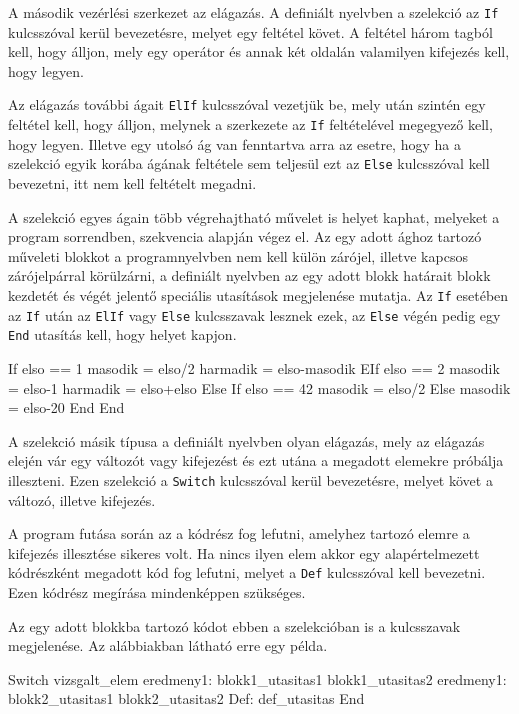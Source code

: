 A második vezérlési szerkezet az elágazás. A definiált nyelvben a szelekció az \texttt{If} kulcsszóval kerül bevezetésre, melyet egy feltétel követ. A feltétel három tagból kell, hogy álljon, mely egy operátor és annak két oldalán valamilyen kifejezés kell, hogy legyen.

Az elágazás további ágait \texttt{ElIf} kulcsszóval vezetjük be, mely után szintén egy feltétel kell, hogy álljon, melynek a szerkezete az \texttt{If} feltételével megegyező kell, hogy legyen. Illetve egy utolsó ág van fenntartva arra az esetre, hogy ha a szelekció egyik korába ágának feltétele sem teljesül ezt az \texttt{Else} kulcsszóval kell bevezetni, itt nem kell feltételt megadni.

A szelekció egyes ágain több végrehajtható művelet is helyet kaphat, melyeket a program sorrendben, szekvencia alapján végez el. Az egy adott ághoz tartozó műveleti blokkot a programnyelvben nem kell külön zárójel, illetve kapcsos zárójelpárral körülzárni, a definiált nyelvben az egy adott blokk határait blokk kezdetét és végét jelentő speciális utasítások megjelenése mutatja. Az \texttt{If} esetében az \texttt{If} után az \texttt{ElIf} vagy \texttt{Else} kulcsszavak lesznek ezek, az \texttt{Else} végén pedig egy \texttt{End} utasítás kell, hogy helyet kapjon.
\begin{cpp}
If elso == 1
	masodik = elso/2
	harmadik = elso-masodik
EIf elso == 2
	masodik = elso-1
	harmadik =  elso+elso
Else
	If elso == 42
		masodik = elso/2
	Else
		masodik = elso-20
	End
End
\end{cpp}

A szelekció másik típusa a definiált nyelvben olyan elágazás, mely az elágazás elején vár egy változót vagy kifejezést és ezt utána a megadott elemekre próbálja illeszteni. Ezen szelekció a \texttt{Switch} kulcsszóval kerül bevezetésre, melyet követ a változó, illetve kifejezés.

A program futása során az a kódrész fog lefutni, amelyhez tartozó elemre a kifejezés illesztése sikeres volt. Ha nincs ilyen elem akkor egy alapértelmezett kódrészként megadott kód fog lefutni, melyet a \texttt{Def} kulcsszóval kell bevezetni. Ezen kódrész megírása mindenképpen szükséges.

Az egy adott blokkba tartozó kódot ebben a szelekcióban is a kulcsszavak megjelenése. Az alábbiakban látható erre egy példa.
\begin{cpp}
Switch vizsgalt_elem
	eredmeny1:
		blokk1_utasitas1
		blokk1_utasitas2
	eredmeny1:
		blokk2_utasitas1
		blokk2_utasitas2
	Def:
		def_utasitas
End
\end{cpp}

